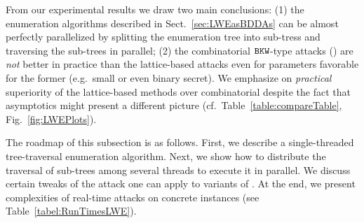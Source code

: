 From our experimental results we draw two main conclusions: (1) the \BDD enumeration algorithms described in Sect.~\ref{sec:LWEasBDDAs} can be almost perfectly parallelized by splitting the enumeration tree into sub-tress and traversing the sub-trees in parallel; (2) the combinatorial $\texttt{BKW}$-type attacks (\cite{C:GuoJohSta15, C:KirFou15}) are \emph{not} better in practice than the lattice-based attacks even for parameters favorable for the former (e.g.\ small or even binary secret).  We emphasize on \emph{practical} superiority of the lattice-based methods over combinatorial despite the fact that asymptotics might present a different picture (cf.\ Table~\ref{table:compareTable}, Fig.~\ref{fig:LWEPlots}). %

The roadmap of this subsection is as follows. First, we describe a single-threaded tree-traversal enumeration algorithm. Next, we show how to distribute the traversal of sub-trees among several threads to execute it in parallel. We discuss certain tweaks of the \BDD attack one can apply to variants of \LWE. At the end, we present complexities of real-time attacks on concrete \LWE instances (see Table~\ref{tabel:RunTimesLWE}).









\clearpage

